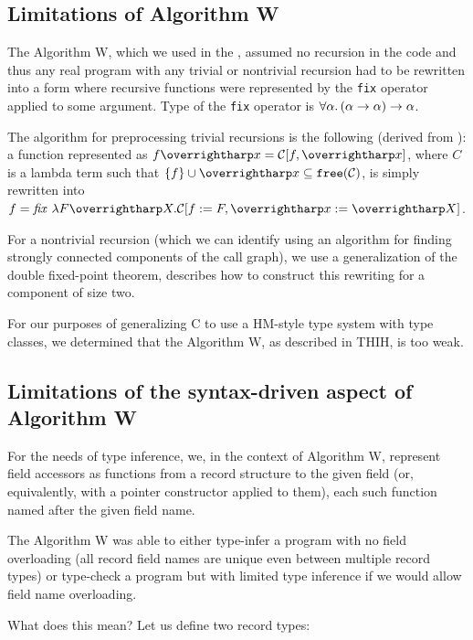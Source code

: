 \subsection{Limitations of Algorithm W}

The Algorithm W, which we used in the , assumed no recursion in the code and thus any real program with any trivial or nontrivial recursion had to be rewritten into a form where recursive functions were represented by the \lstinline{fix} operator applied to some argument. Type of the \lstinline{fix} operator is $\forall \alpha . \left(\alpha \to \alpha\right) \to \alpha$.

The algorithm for preprocessing trivial recursions is the following (derived from ): a function represented as $f \vect{x} = \calC[f, \vect{x}]$, where $C$ is a lambda term such that $\{f\} \cup \vect{x} \subseteq \free \calC$, is simply rewritten into $f = \mathit{fix}\ \lambda F \vect{X} .\calC[f := F, \vect{x} := \vect{X}]$.

For a nontrivial recursion (which we can identify using an algorithm for finding strongly connected components of the call graph), we use a generalization of the double fixed-point  theorem, describes how to construct this rewriting for a component of size two.

For our purposes of generalizing C to use a HM-style type system with type classes, we determined that the Algorithm W, as described in THIH, is too weak.

\subsection{Limitations of the syntax-driven aspect of Algorithm W}
\label{ex_structs}

\begin{defn}
    For the needs of type inference, we, in the context of Algorithm W, represent field accessors as functions from a record structure to the given field (or, equivalently, with a pointer constructor applied to them), each such function named after the given field name.
\end{defn}

The Algorithm W was able to either type-infer a program with no field overloading (all record field names are unique even between multiple record types) or type-check a program but with limited type inference if we would allow field name overloading.

What does this mean? Let us define two record types:


